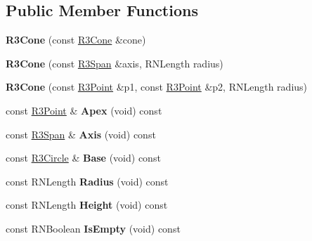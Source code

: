 \subsection*{Public Member Functions}
\begin{DoxyCompactItemize}
\item 
{\bfseries R3\+Cone} (const \hyperlink{class_r3_cone}{R3\+Cone} \&cone)\hypertarget{class_r3_cone_a2402226d1c55a351cf8f60427a503543}{}\label{class_r3_cone_a2402226d1c55a351cf8f60427a503543}

\item 
{\bfseries R3\+Cone} (const \hyperlink{class_r3_span}{R3\+Span} \&axis, R\+N\+Length radius)\hypertarget{class_r3_cone_a2368eaab7cdf8b154cb0e3b6a4151785}{}\label{class_r3_cone_a2368eaab7cdf8b154cb0e3b6a4151785}

\item 
{\bfseries R3\+Cone} (const \hyperlink{class_r3_point}{R3\+Point} \&p1, const \hyperlink{class_r3_point}{R3\+Point} \&p2, R\+N\+Length radius)\hypertarget{class_r3_cone_ab8563607c5b602c23e8e66092ccc4ac8}{}\label{class_r3_cone_ab8563607c5b602c23e8e66092ccc4ac8}

\item 
const \hyperlink{class_r3_point}{R3\+Point} \& {\bfseries Apex} (void) const \hypertarget{class_r3_cone_a55290a30b1f5b7737292d6523839254e}{}\label{class_r3_cone_a55290a30b1f5b7737292d6523839254e}

\item 
const \hyperlink{class_r3_span}{R3\+Span} \& {\bfseries Axis} (void) const \hypertarget{class_r3_cone_a42ad8d932f2921da7b89626c462895eb}{}\label{class_r3_cone_a42ad8d932f2921da7b89626c462895eb}

\item 
const \hyperlink{class_r3_circle}{R3\+Circle} \& {\bfseries Base} (void) const \hypertarget{class_r3_cone_a2932710d54570fd65907b8f1c18f3df9}{}\label{class_r3_cone_a2932710d54570fd65907b8f1c18f3df9}

\item 
const R\+N\+Length {\bfseries Radius} (void) const \hypertarget{class_r3_cone_a65de1e311cb0e9e80bb8b18888d6b4c8}{}\label{class_r3_cone_a65de1e311cb0e9e80bb8b18888d6b4c8}

\item 
const R\+N\+Length {\bfseries Height} (void) const \hypertarget{class_r3_cone_ab239ce5e790e1d5c45bcbc71e6bf77e1}{}\label{class_r3_cone_ab239ce5e790e1d5c45bcbc71e6bf77e1}

\item 
const R\+N\+Boolean {\bfseries Is\+Empty} (void) const \hypertarget{class_r3_cone_a4aac255739fac2f7c6e18410d8496ba8}{}\label{class_r3_cone_a4aac255739fac2f7c6e18410d8496ba8}


\end{DoxyCompactItemize}
